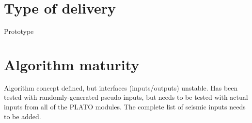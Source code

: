 \documentclass[a4paper, oneside, 11pt, article, english]{memoir}
\begin{document}
\section{Type of delivery}
\label{sec:delivery}

Prototype

\iffalse
{
  \itshape

  The algorithms which are specified for the pipeline can come in different
  shapes and forms. We expect that the specifications will be delivered to the
  PDC under different forms, accordingly. Please indicate which one applies to
  the specified algorithm:

  \begin{itemize}
    \firmlist
  \item a legacy code. In that case, please contact WP12 office because some
    quality requirements are needed.
  \item a prototype. In that case, and in the first version of this document, no
    pseudo-code is to be provided.
  \item a pseudo-code. If no prototype exists, a workflow describing the
    algorithm main steps and a detailed pseudo-code is needed for
    implementation.
  \end{itemize}
}
\fi


\section{Algorithm maturity}
\label{sec:mature}

Algorithm concept defined, but interfaces (inputs/outputs) unstable. 
Has been tested with randomly-generated pseudo inputs, but needs to be tested with actual inputs from all of the PLATO modules. The complete list of seismic inputs needs to be added. 

\iffalse
{
  \itshape

  Please specify the maturity level of the algorithm and do not hesitate to
  provide any further information on the current status of the algorithm. The
  convention for algorithm maturity is defined as:

  \begin{itemize}
    \firmlist
  \item algorithm not defined
  \item algorithm concept defined, but interfaces (inputs/outputs) unstable
  \item algorithm concept defined and interfaces (inputs/outputs) stable, but
    not all processing steps stable
  \item no change or only minor changes expected
  \end{itemize}

}
\fi
\end{document}

